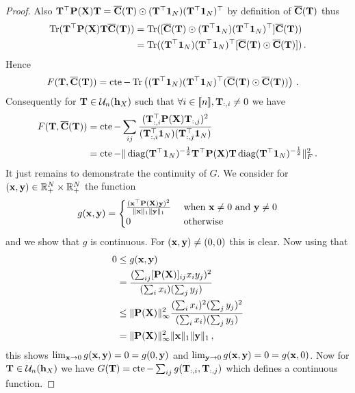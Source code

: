 \begin{proof}
	Also ${\mathbf{T}}^\top {\mathbf{P}}({\mathbf{X}}) {\mathbf{T}} = \overline{{\mathbf{C}}}({\mathbf{T}}) \odot ({\mathbf{T}}^\top \bm{1}_N) ({\mathbf{T}}^\top \bm{1}_N)^\top$ by definition of $\overline{{\mathbf{C}}}({\mathbf{T}})$ thus 
	\begin{equation}
		\begin{split}
			\operatorname{Tr}({\mathbf{T}}^\top {\mathbf{P}}({\mathbf{X}}) {\mathbf{T}} \overline {{\mathbf{C}}}({\mathbf{T}})) &= \operatorname{Tr}([\overline{{\mathbf{C}}}({\mathbf{T}}) \odot ({\mathbf{T}}^\top \bm{1}_N) ({\mathbf{T}}^\top \bm{1}_N)^\top] \overline {{\mathbf{C}}}({\mathbf{T}})) \\
			&=\operatorname{Tr}(({\mathbf{T}}^\top \bm{1}_N) ({\mathbf{T}}^\top \bm{1}_N)^\top [\overline{{\mathbf{C}}}({\mathbf{T}})\odot\overline{{\mathbf{C}}}({\mathbf{T}})])\,.
		\end{split}
	\end{equation}
	Hence 
	\begin{equation}
		\begin{split}
			F({\mathbf{T}}, \overline{{\mathbf{C}}}({\mathbf{T}})) &= \operatorname{cte} - \operatorname{Tr}\left(({\mathbf{T}}^\top \bm{1}_N) ({\mathbf{T}}^\top \bm{1}_N)^\top(\overline{{\mathbf{C}}}({\mathbf{T}}) \odot \overline{{\mathbf{C}}}({\mathbf{T}}))\right)\,.
		\end{split}
	\end{equation}
	Consequently for ${\mathbf{T}} \in {\mathcal{U}}_{n}({\mathbf{h}}_X)$ such that $\forall i \in {[\![n]\!]}, {\mathbf{T}}_{:,i} \neq 0$ we have
	\begin{equation}
		\begin{split}
			F({\mathbf{T}}, \overline{{\mathbf{C}}}({\mathbf{T}})) &= \operatorname{cte} - \sum_{ij} \frac{({\mathbf{T}}_{:,i}^\top {\mathbf{P}}({\mathbf{X}}) {\mathbf{T}}_{:,j})^{2}}{({\mathbf{T}}_{:,i}^\top \bm{1}_N)({\mathbf{T}}_{:,j}^\top\bm{1}_N)} \\
			&= \operatorname{cte} - \|\operatorname{diag}({\mathbf{T}}^\top \bm{1}_N)^{-\frac{1}{2}} {\mathbf{T}}^\top {\mathbf{P}}({\mathbf{X}}) {\mathbf{T}}\operatorname{diag}({\mathbf{T}}^\top \bm{1}_N)^{-\frac{1}{2}}\|_F^2\,.
		\end{split}
	\end{equation}
	It just remains to demonstrate the continuity of $G$. We consider for $({\mathbf{x}}, {\mathbf{y}}) \in \mathbb{R}_+^{N} \times \mathbb{R}_+^{N}$ the function 
	\begin{equation}
		g({\mathbf{x}}, {\mathbf{y}}) = \begin{cases} \frac{({\mathbf{x}}^\top {\mathbf{P}}({\mathbf{X}}) {\mathbf{y}})^2}{\|{\mathbf{x}}\|_1 \|{\mathbf{y}}\|_1} &\text{ when } {\mathbf{x}} \neq 0 \text{ and } {\mathbf{y}} \neq 0 \\ 0 &\text{ otherwise}\end{cases}
	\end{equation}
	and we show that $g$ is continuous. For $({\mathbf{x}}, {\mathbf{y}}) \neq (0, 0)$ this is clear. Now using that
	\begin{align} 
		0 &\leq g({\mathbf{x}}, {\mathbf{y}}) \\
        &= \frac{(\sum_{ij} [{\mathbf{P}}({\mathbf{X}})]_{ij} x_i y_j)^2}{(\sum_{i} x_i)(\sum_{j} y_j)} \\
        &\leq \|{\mathbf{P}}({\mathbf{X}})\|^2_{\infty} \frac{(\sum_{i} x_i)^2(\sum_{j} y_j)^2}{(\sum_{i} x_i)(\sum_{j} y_j)} \\
        &= \|{\mathbf{P}}({\mathbf{X}})\|^2_{\infty} \|{\mathbf{x}}\|_1 \|{\mathbf{y}}\|_1\,,
	\end{align}
	this shows $\lim_{{\mathbf{x}} \to 0} g({\mathbf{x}}, {\mathbf{y}}) = 0 = g(0, {\mathbf{y}})$ and $\lim_{{\mathbf{y}} \to 0} g({\mathbf{x}}, {\mathbf{y}}) = 0 = g({\mathbf{x}}, 0)$. Now for ${\mathbf{T}} \in {\mathcal{U}}_{n}({\mathbf{h}}_X)$ we have $G({\mathbf{T}}) = \operatorname{cte} - \sum_{ij} g({\mathbf{T}}_{:,i}, {\mathbf{T}}_{:,j})$ which defines a continuous function.
	

\end{proof}
